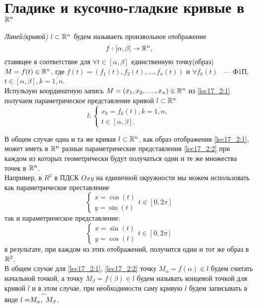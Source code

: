 \documentclass[../../main.tex]{subfiles}
\begin{document}
\section{Гладике и кусочно-гладкие кривые в $\mathbb{R}^n$}

\emph{Линей(кривой)} $l \subset \mathbb{R}^n $ будем 
называеть произвольное отображение
\begin{equation}
  \label{lec17_2:1}
  f: [\alpha, \beta] \to \mathbb{R}^n,
\end{equation}
ставящее в соответствие для $\forall t \in [\alpha, \beta]$ 
единственную точку(образ) $M = f(t) \in \mathbb{R}^n$,
где $f(t) = (f_1(t), f_2(t), \ldots, f_n(t))$ и
$\forall f_k(t)$ ~--- Ф1П, $t \in [\alpha, \beta], k = \overline{1,n}$.\\
Испульзую координатную запись
$M = (x_1, x_2, \ldots, x_n) \in \mathbb{R}^n$ из \eqref{lec17_2:1} 
получаем параметрическое представление кривой $l \subset \mathbb{R}^n$
\begin{equation}
 \label{lec17_2:2}
 l: 
 \left\{
  \begin{array}{cc}
    x_k = f_k(t), k = \overline{1,n},\\
    t \in \left[\alpha, \beta\right].
  \end{array}
 \right.
\end{equation}

В общем случае одна и та же кривая $l \subset \mathbb{R}^n$, 
как образ отображения \eqref{lec17_2:1}, может иметь в $\mathbb{R}^n$ разные
параметрические представления \eqref{lec17_2:2} при каждом из которых 
геометрически 
будут получаться одни и те же множества точек в $\mathbb{R}^n$.\\
Например, в $R^2$ в ПДСК  $Oxy$ на единичной окружности мы можем 
использовать как параметрическое преставление
\[
\left\{
  \begin{array}{cc}
    x = \cos(t) \\
    y = \sin(t)
  \end{array}
  \right.
  t \in \left[0, 2\pi \right]
\] 
так и параметрическое представление:
\[
\left\{
  \begin{array}{cc}
    x = \sin(t) \\
    y = \cos(t)
  \end{array}
  \right.
  t \in \left[0, 2\pi \right]
\] 
в результате, при каждом из этих отображений, 
получится один и тот же образ в $\mathbb{R}^2$.\\
В общем случае для \eqref{lec17_2:1}, \eqref{lec17_2:2}
точку $M_\alpha = f(\alpha) \in l$ будем считать начальной точкой,
а точку $M_\beta = f(\beta) \in l$ будем называть концевой точкой для кривой 
$l$ и в этом случае, при необходимости саму кривую $l$ будем записывать в виде
$l = \buildrel\,\,\frown\over{M_\alpha,\ M_\beta}$.
\end{document}
